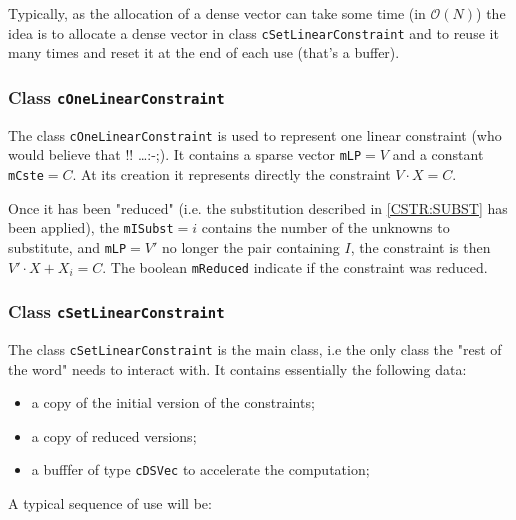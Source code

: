 Typically, as the allocation of a dense vector can take some time (in  $\mathcal{O}(N)$) the idea is to allocate
a dense vector in class {\tt cSetLinearConstraint} and to reuse it many times and reset it at the end of each use
(that's a buffer).



\subsubsection{Class {\tt cOneLinearConstraint} }


The class {\tt cOneLinearConstraint} is used to represent one linear constraint (who would believe that !! \dots  :-;).
It contains a sparse vector {\tt mLP}$=V$ and a constant {\tt mCste}$=C$. At its creation it
represents directly the constraint  $V \cdot X = C$.

Once it has been "reduced" (i.e. the substitution described in  \ref{CSTR:SUBST} has been applied),
the {\tt mISubst}$=i$ contains the number of the unknowns to substitute, and {\tt mLP}$=V'$ no longer the
pair containing $I$, the constraint is then $V' \cdot X + X_i = C$.  The boolean {\tt mReduced}
indicate if the constraint was reduced.


\subsubsection{Class {\tt cSetLinearConstraint} }

The class {\tt cSetLinearConstraint} is the  main class, i.e the only class the
"rest of the word" needs to interact with. It contains essentially the following data:

\begin{itemize}
    \item  a copy of the initial version of the constraints;
    \item  a copy of reduced versions;
    \item  a bufffer of type {\tt cDSVec} to accelerate the computation;
\end{itemize}

A typical sequence of use will be:


